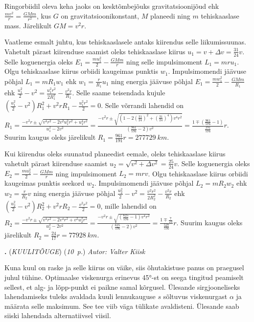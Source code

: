 \documentclass[11pt,a5paper]{article}
\newcommand{\numb}[1]{\vspace{5pt}\textbf{\large #1}}
\newcommand{\nimi}[1]{(\textsl{\small \uppercase{#1}})}
\newcommand{\punktid}[1]{(\emph{#1~p.})}
\newcounter{ylesanne}
\newcommand{\yl}[1]{\addtocounter{ylesanne}{1}\numb{\theylesanne.} \nimi{#1} \newblock{}}
\newcommand{\autor}[1]{\emph{Autor: #1}}%
\begin{document}
Ringorbiidil oleva keha jaoks on kesktõmbejõuks gravitatsioonijõud ehk $\frac{mv^2}{r}=\frac{GMm}{r^2}$, kus $G$ on gravitatsioonikonstant, $M$ planeedi ning $m$ tehiskaaslase mass. Järelikult $GM=v^2r$.

Vaatleme esmalt juhtu, kus tehiskaaslasele antaks kiirendus selle liikumissuunas. Vahetult pärast kiirenduse saamist oleks tehiskaaslase kiirus $u_1=v+\Delta v=\frac{31}{24}v$. Selle koguenergia oleks $E_1=\frac{mu_1^2}{2}-\frac{GMm}{r}$ ning selle impulsimoment $L_1=mru_1$. Olgu tehiskaaslase kiirus orbiidi kaugeimas punktis $w_1$. Impulsimomendi jäävuse põhjal $L_1=mR_1w_1$ ehk $w_1=\frac{r}{R_1}u_1$ ning energia jäävuse põhjal $E_1=\frac{mw_1^2}{2}-\frac{GMm}{R_1}$ ehk $\frac{u_1^2}{2}-v^2=\frac{u_1^2r^2}{2R_1^2}-\frac{v^2r}{R_1}$. Selle saame teisendada kujule $\left(\frac{u_1^2}{2}-v^2\right)R_1^2+v^2rR_1-\frac{u_1^2r^2}{2}=0$. Selle võrrandi lahendid on $R_1=\frac{-v^2r\pm\sqrt{v^4r^2-2v^2u_1^2r^2+u_1^4r^2}}{u_1^2-2v^2}=\frac{-v^2r\pm\sqrt{\left(1-2\left(\frac{31}{24}\right)^2+\left(\frac{31}{24}\right)^4\right)v^4r^2}}{\left(\frac{961}{576}-2\right)v^2}=\frac{1\mp\left(\frac{961}{576}-1\right)}{\frac{191}{576}}r$. Suurim kaugus oleks järelikult $R_1=\frac{961}{191}r=\SI{277729}{km}$.

Kui kiirendus oleks suunatud planeedist eemale, oleks tehiskaaslase kiirus vahetult pärast kiirenduse saamist $u_2=\sqrt{v^2+\Delta v^2}=\frac{25}{24}v$. Selle koguenergia oleks $E_2=\frac{mu_2^2}{2}-\frac{GMm}{r}$ ning impulsimoment $L_2=mrv$. Olgu tehiskaaslase kiirus orbiidi kaugeimas punktis seekord $w_2$. Impulsimomendi jäävuse põhjal $L_2=mR_2w_2$ ehk $w_2=\frac{r}{R_2}v$ ning energia jäävuse põhjal $\frac{u_2^2}{2}-v^2=\frac{v^2r^2}{2R_2^2}-\frac{v^2r}{R_2}$ ehk $\left(\frac{u_2^2}{2}-v^2\right)R_2^2+v^2rR_2-\frac{v^2r^2}{2}=0$, mille lahendid on $R_2=\frac{-v^2r\pm\sqrt{v^4r^2-2v^4r^2+v^2u_2^2r^2}}{u_2^2-2v^2}=\frac{-v^2r\pm\sqrt{\left(\frac{625}{576}-1\right)v^4r^2}}{\left(\frac{625}{576}-2\right)v^2}=\frac{1\mp\frac{7}{24}}{\frac{527}{576}}r$. Suurim kaugus oleks järelikult $R_2=\frac{24}{17}r=\SI{77928}{km}$.

\yl{Kuulitõuge}
\punktid{10} \autor{Valter Kiisk}\par

Kuna kuul on raske ja selle kiirus on väike, siis õhutakistuse panus on praegusel juhul tühine. Optimaalse viskenurga erinevus \ang{45}-st on seega tingitud peamiselt sellest, et alg- ja lõpp-punkt ei paikne samal kõrgusel. Ülesande sirgjooneliseks lahendamiseks tuleks avaldada kuuli lennukauguse $s$ sõltuvus viskenurgast $\alpha$ ja määrata selle maksimum. See tee viib väga tülikate avaldisteni. Ülesande saab siiski lahendada alternatiivsel viisil.
\end{document}

